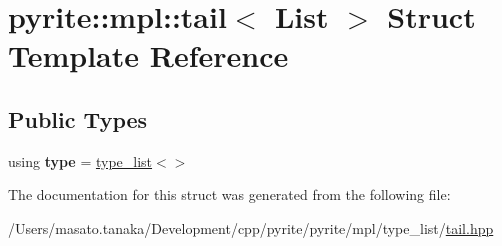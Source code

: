 \hypertarget{structpyrite_1_1mpl_1_1tail}{}\section{pyrite\+:\+:mpl\+:\+:tail$<$ List $>$ Struct Template Reference}
\label{structpyrite_1_1mpl_1_1tail}
\subsection*{Public Types}
\begin{DoxyCompactItemize}
\item 
\mbox{\label{structpyrite_1_1mpl_1_1tail_a322a8b644102b0082116da1c6c88d84f}} 
using {\bfseries type} = \mbox{\hyperlink{structpyrite_1_1core_1_1mpl_1_1type__list}{type\+\_\+list}}$<$$>$
\end{DoxyCompactItemize}


The documentation for this struct was generated from the following file\+:\begin{DoxyCompactItemize}
\item 
/\+Users/masato.\+tanaka/\+Development/cpp/pyrite/pyrite/mpl/type\+\_\+list/\mbox{\hyperlink{tail_8hpp}{tail.\+hpp}}\end{DoxyCompactItemize}
